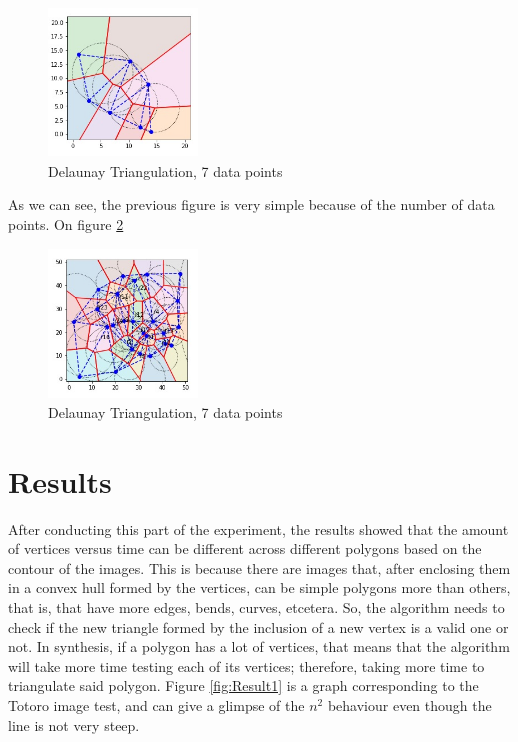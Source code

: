 \documentclass[conference]{IEEEtran}
\begin{document}
\begin{figure}[H]
    \centering
    \includegraphics[width=150,height=150,keepaspectratio]{delaunay1.jpg}
    \caption{Delaunay Triangulation, 7 data points}
    \label{fig:Delaunay1}
\end{figure}
As we can see, the previous figure is very simple because of the number of data points. On figure \ref{fig:Delaunay2}

\begin{figure}[H]
    \centering
    \includegraphics[width=150,height=150,keepaspectratio]{delaunay25.jpg}
    \caption{Delaunay Triangulation, 7 data points}
    \label{fig:Delaunay2}
\end{figure}

\section{Results}
After conducting this part of the experiment, the results showed that the amount of vertices versus time can be different across different polygons based on the contour of the images. This is because there are images that, after enclosing them in a convex hull formed by the vertices, can be simple polygons more than others, that is, that have more edges, bends, curves, etcetera. So, the algorithm needs to check if the new triangle formed by the inclusion of a new vertex is a valid one or not. In synthesis, if a polygon has a lot of vertices, that means that the algorithm will take more time testing each of its vertices; therefore, taking more time to triangulate said polygon. Figure \ref{fig:Result1} is a graph corresponding to the Totoro image test, and can give a glimpse of the $n^2$ behaviour even though the line is not very steep.\\
\end{document}
